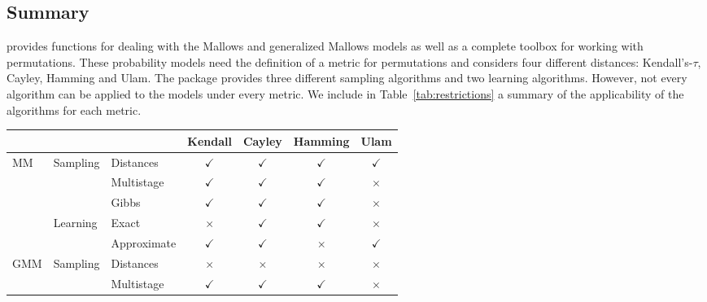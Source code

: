 \documentclass[article,nojss]{jss}
\begin{document}
\subsection{Summary}
 provides functions for dealing with the Mallows and generalized Mallows models as well as a complete toolbox for working with permutations. These probability models need the definition of a metric for permutations and  considers four different distances: Kendall's-$\tau$, Cayley, Hamming and Ulam. The  package provides three different sampling algorithms and two learning algorithms. However, not every algorithm can be applied to the models under every metric. We include in Table~\ref{tab:restrictions} a summary of the applicability of the algorithms for each metric. 


 \begin{table}[h]
\begin{tabular}{lllcccc}
\multicolumn{3}{l}{}                     & \multicolumn{1}{l}{Kendall} & \multicolumn{1}{l}{Cayley} & \multicolumn{1}{l}{Hamming} & \multicolumn{1}{l}{Ulam} \\
\hline\hline
\multirow{5}{*}{MM}  
& \multirow{3}{*}{Sampling} 
						& Distances   	& $\checkmark$              	& $\checkmark$               & $\checkmark$                	& $\checkmark$             \\
                     &                           	& Multistage  	& $\checkmark$                	& $\checkmark$               & $\checkmark$                	&          $\times$                \\
                     &                           	& Gibbs       	& $\checkmark$                	& $\checkmark$               & $\checkmark$                	&          $\times$     \\
\cline{2-7}
& \multirow{2}{*}{Learning} 	& Exact       	&$\times$                 		& $\checkmark$               & $\checkmark$                	&$\times$                \\
                     &                           	& Approximate & $\checkmark$                	& $\checkmark$               & $\times$                  		& $\checkmark$             \\
\hline\hline
\multirow{5}{*}{GMM} & \multirow{3}{*}{Sampling} 
						& Distances   	&$\times$                 		&$\times$                  		&$\times$                   		&$\times$               \\
                     &                           	& Multistage  	& $\checkmark$                	& $\checkmark$               & $\checkmark$                	&$\times$           \\

\end{tabular}
\end{table}
\end{document}
